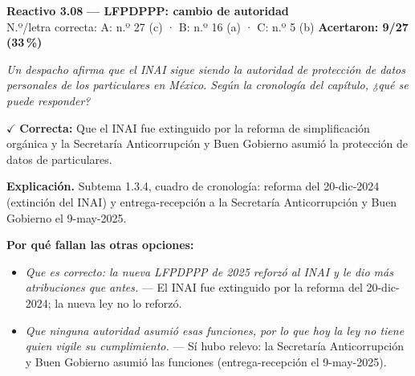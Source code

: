 \documentclass[10pt,letterpaper]{article}
\begin{document}
\begin{minipage}{\textwidth}
{\color{guinda}\textbf{Reactivo 3.08}} \textbf{— LFPDPPP: cambio de autoridad}\\[-1pt]
{\scriptsize N.º/letra correcta: A: n.º 27 (c) · B: n.º 16 (a) · C: n.º 5 (b) \hfill \textbf{Acertaron: 9/27 (33\,\%)}}

\textit{Un despacho afirma que el INAI sigue siendo la autoridad de protección de datos personales de los particulares en México. Según la cronología del capítulo, ¿qué se puede responder?}

\textcolor{verde}{$\checkmark$} \textbf{Correcta:} Que el INAI fue extinguido por la reforma de simplificación orgánica y la Secretaría Anticorrupción y Buen Gobierno asumió la protección de datos de particulares.

\textbf{Explicación.} Subtema 1.3.4, cuadro de cronología: reforma del 20-dic-2024 (extinción del INAI) y entrega-recepción a la Secretaría Anticorrupción y Buen Gobierno el 9-may-2025.

\textbf{Por qué fallan las otras opciones:}
\begin{itemize}[itemsep=0pt,topsep=1pt,leftmargin=1.3em,parsep=0pt]
\item[\textcolor{rojo}{$\times$}] \textit{Que es correcto: la nueva LFPDPPP de 2025 reforzó al INAI y le dio más atribuciones que antes.} --- El INAI fue extinguido por la reforma del 20-dic-2024; la nueva ley no lo reforzó.
\item[\textcolor{rojo}{$\times$}] \textit{Que ninguna autoridad asumió esas funciones, por lo que hoy la ley no tiene quien vigile su cumplimiento.} --- Sí hubo relevo: la Secretaría Anticorrupción y Buen Gobierno asumió las funciones (entrega-recepción el 9-may-2025).
\end{itemize}
\end{minipage}\par\vspace{5pt}{\color{gray!40}\hrule}\vspace{5pt}
\end{document}
